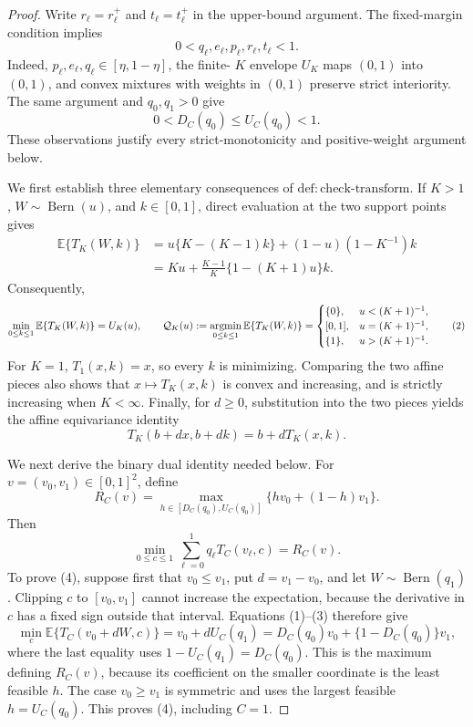 \documentclass{article}
\begin{document}
\begin{proof}
Write \(r_\ell=r_\ell^+\) and \(t_\ell=t_\ell^+\) in the upper-bound argument.  The fixed-margin condition implies
\[
 0<q_\ell,e_\ell,p_\ell,r_\ell,t_\ell<1.
\]
Indeed, \(p_\ell,e_\ell,q_\ell\in[\eta,1-\eta]\), the finite-
\(K\) envelope \(U_K\) maps \((0,1)\) into \((0,1)\), and convex
mixtures with weights in \((0,1)\) preserve strict interiority.  The
same argument and \(q_0,q_1>0\) give
\[
 0<D_C(q_0)\leq U_C(q_0)<1.
\]
These observations justify every strict-monotonicity and positive-weight
argument below.

We first establish three elementary consequences of
\(\mathrm{def{:}check\text{-}transform}\).  If \(K>1\),
\(W\sim\operatorname{Bern}(u)\), and \(k\in[0,1]\), direct evaluation
at the two support points gives
\[
 \begin{aligned}
 \mathbb E\{T_K(W,k)\}
 &=u\{K-(K-1)k\}+(1-u)(1-K^{-1})k\\
 &=Ku+\frac{K-1}{K}\{1-(K+1)u\}k.                 \tag{1}
 \end{aligned}
\]
Consequently,
\[
 \min_{0\leq k\leq1}\mathbb E\{T_K(W,k)\}=U_K(u),
 \qquad
 \mathcal Q_K(u):=\mathop{\rm argmin}_{0\leq k\leq1}
 \mathbb E\{T_K(W,k)\}
 =
 \begin{cases}
 \{0\},&u<(K+1)^{-1},\\
 [0,1],&u=(K+1)^{-1},\\
 \{1\},&u>(K+1)^{-1}.
 \end{cases}                                                   \tag{2}
\]
For \(K=1\), \(T_1(x,k)=x\), so every \(k\) is minimizing.  Comparing
the two affine pieces also shows that \(x\mapsto T_K(x,k)\) is convex
and increasing, and is strictly increasing when \(K<\infty\).  Finally,
for \(d\geq0\), substitution into the two pieces yields the affine
equivariance identity
\[
 T_K(b+dx,b+dk)=b+dT_K(x,k).                         \tag{3}
\]

We next derive the binary dual identity needed below.  For
\(v=(v_0,v_1)\in[0,1]^2\), define
\[
 R_C(v)=\max_{h\in[D_C(q_0),U_C(q_0)]}
          \{hv_0+(1-h)v_1\}.
\]
Then
\[
 \min_{0\leq c\leq1}\sum_{\ell=0}^1q_\ell T_C(v_\ell,c)=R_C(v).
                                                               \tag{4}
\]
To prove (4), suppose first that \(v_0\leq v_1\), put
\(d=v_1-v_0\), and let \(W\sim\operatorname{Bern}(q_1)\).
Clipping \(c\) to \([v_0,v_1]\) cannot increase the expectation,
because the derivative in \(c\) has a fixed sign outside that interval.
Equations (1)--(3) therefore give
\[
 \min_c\mathbb E\{T_C(v_0+dW,c)\}
 =v_0+dU_C(q_1)
 =D_C(q_0)v_0+\{1-D_C(q_0)\}v_1,
\]
where the last equality uses
\(1-U_C(q_1)=D_C(q_0)\).  This is the maximum defining \(R_C(v)\),
because its coefficient on the smaller coordinate is the least feasible
\(h\).  The case \(v_0\geq v_1\) is symmetric and uses the largest
feasible \(h=U_C(q_0)\).  This proves (4), including \(C=1\).


\end{proof}
\end{document}
